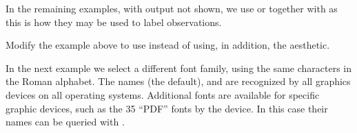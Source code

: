 \documentclass[krantz2]{krantz}\usepackage{knitr}
\begin{document}
In the remaining examples, with output not shown, we use  or  together with  as this is how they may be used to label observations.

\begin{knitrout}\footnotesize
{}\color{fgcolor}\begin{kframe}
\begin{alltt}
 \hlkwb{<-}
  \hlstd{(} \hlstd{=} \hlopt{:}\hlstd{,}
              \hlstd{=} \hlstd{(}\hlstd{,} \hlstd{),}
              \hlstd{=} \hlstd{(}\hlstd{,} \hlstd{,} \hlstd{,} \hlstd{,} \hlstd{))}

    \hlopt{+}
  \hlstd{(} \hlstd{=} \hlstd{,}  \hlstd{=} \hlstd{,}  \hlstd{=} \hlstd{)} \hlopt{+}
  \hlstd{()}
\end{alltt}
\end{kframe}
\end{knitrout}

\begin{playground}
Modify the example above to use  instead of  using, in addition, the  aesthetic.
\end{playground}

In the next example we select a different font family, using the same characters in the Roman alphabet. The names  (the default),  and  are recognized by all graphics devices on all operating systems. Additional fonts are available for specific graphic devices, such as the 35 ``PDF'' fonts by the  device. In this case their names can be queried with .

\begin{knitrout}\footnotesize
{}\color{fgcolor}\begin{kframe}
\begin{alltt}
    \hlopt{+}
  \hlstd{(} \hlstd{=} \hlstd{,}  \hlstd{=} \hlstd{,}  \hlstd{=} \hlstd{,}  \hlstd{=} \hlstd{)} \hlopt{+}
  \hlstd{()}
\end{alltt}
\end{kframe}
\end{knitrout}
\end{document}
